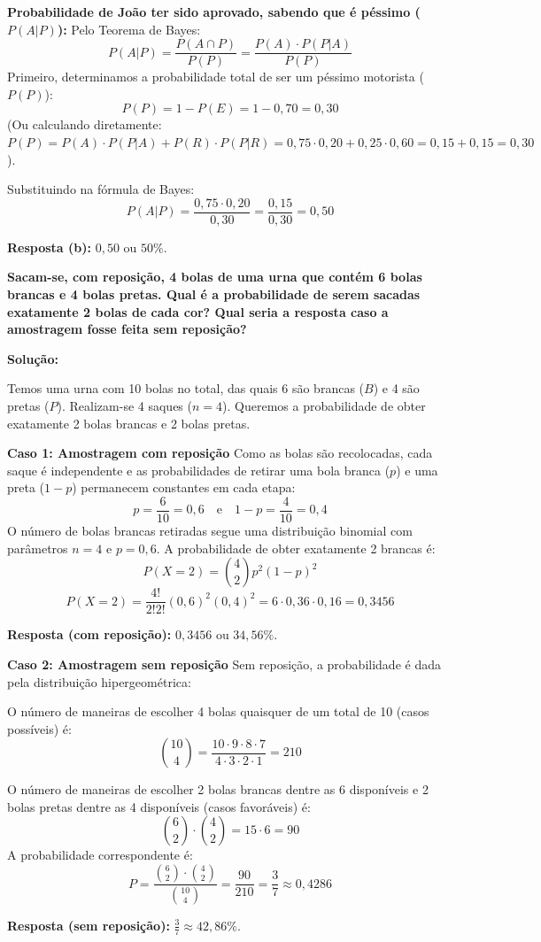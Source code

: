 \documentclass[a4paper,10pt,landscape,twocolumn]{article}  %
\let\oldenumerate\enumerate
\let\oldendenumerate\endenumerate
\renewenvironment{enumerate}{%
  \oldenumerate%
  \setlength{\itemsep}{1pt}%
  \setlength{\parskip}{0pt}%
  \setlength{\parsep}{0pt}%
  \setlength{\topsep}{2pt}%
  \setlength{\partopsep}{0pt}%
}{%
  \oldendenumerate%
}
\let\olditemize\itemize
\let\oldenditemize\enditemize
\renewenvironment{itemize}{%
  \olditemize%
  \setlength{\itemsep}{1pt}%
  \setlength{\parskip}{0pt}%
  \setlength{\parsep}{0pt}%
  \setlength{\topsep}{2pt}%
  \setlength{\partopsep}{0pt}%
}{%
  \oldenditemize%
}
\begin{document}
\begin{enumerate}
\begin{enumerate}
        \item \textbf{Probabilidade de João ter sido aprovado, sabendo que é péssimo ($P(A|P)$):}
        Pelo Teorema de Bayes:
        \[ P(A|P) = \frac{P(A \cap P)}{P(P)} = \frac{P(A) \cdot P(P|A)}{P(P)} \]
        Primeiro, determinamos a probabilidade total de ser um péssimo motorista ($P(P)$):
        \[ P(P) = 1 - P(E) = 1 - 0,70 = 0,30 \]
        (Ou calculando diretamente: $P(P) = P(A)\cdot P(P|A) + P(R)\cdot P(P|R) = 0,75\cdot 0,20 + 0,25\cdot 0,60 = 0,15 + 0,15 = 0,30$).
        
        Substituindo na fórmula de Bayes:
        \[ P(A|P) = \frac{0,75 \cdot 0,20}{0,30} = \frac{0,15}{0,30} = 0,50 \]
        
        \textbf{Resposta (b):} $0,50$ ou $50\%$.
    \end{enumerate}

    \item \textbf{Sacam-se, com reposição, 4 bolas de uma urna que contém 6 bolas brancas e 4 bolas pretas. Qual é a probabilidade de serem sacadas exatamente 2 bolas de cada cor? Qual seria a resposta caso a amostragem fosse feita sem reposição?}
    
    \textbf{Solução:}
    
    Temos uma urna com 10 bolas no total, das quais 6 são brancas ($B$) e 4 são pretas ($P$). Realizam-se 4 saques ($n = 4$). Queremos a probabilidade de obter exatamente 2 bolas brancas e 2 bolas pretas.
    
    \textbf{Caso 1: Amostragem com reposição}
    Como as bolas são recolocadas, cada saque é independente e as probabilidades de retirar uma bola branca ($p$) e uma preta ($1-p$) permanecem constantes em cada etapa:
    \[ p = \frac{6}{10} = 0,6 \quad \text{e} \quad 1-p = \frac{4}{10} = 0,4 \]
    O número de bolas brancas retiradas segue uma distribuição binomial com parâmetros $n = 4$ e $p = 0,6$. A probabilidade de obter exatamente 2 brancas é:
    \[ P(X = 2) = \binom{4}{2} p^2 (1-p)^{2} \]
    \[ P(X = 2) = \frac{4!}{2!2!} (0,6)^2 (0,4)^2 = 6 \cdot 0,36 \cdot 0,16 = 0,3456 \]
    
    \textbf{Resposta (com reposição):} $0,3456$ ou $34,56\%$.
    
    \textbf{Caso 2: Amostragem sem reposição}
    Sem reposição, a probabilidade é dada pela distribuição hipergeométrica:
    \begin{itemize}
        \item O número de maneiras de escolher 4 bolas quaisquer de um total de 10 (casos possíveis) é:
        \[ \binom{10}{4} = \frac{10 \cdot 9 \cdot 8 \cdot 7}{4 \cdot 3 \cdot 2 \cdot 1} = 210 \]
        \item O número de maneiras de escolher 2 bolas brancas dentre as 6 disponíveis e 2 bolas pretas dentre as 4 disponíveis (casos favoráveis) é:
        \[ \binom{6}{2} \cdot \binom{4}{2} = 15 \cdot 6 = 90 \]
    \end{itemize}
    A probabilidade correspondente é:
    \[ P = \frac{\binom{6}{2} \cdot \binom{4}{2}}{\binom{10}{4}} = \frac{90}{210} = \frac{3}{7} \approx 0,4286 \]
    
    \textbf{Resposta (sem reposição):} $\frac{3}{7} \approx 42,86\%$.
           
\end{enumerate}
\end{document}

